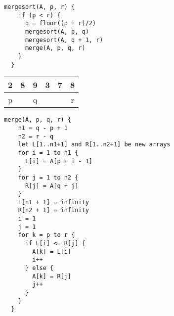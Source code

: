 \documentclass{article}
\begin{document}
\Large

\begin{Verbatim}[frame=single]
  mergesort(A, p, r) {
    if (p < r) {
      q = floor((p + r)/2)
      mergesort(A, p, q)
      mergesort(A, q + 1, r)
      merge(A, p, q, r)
    }
  }
\end{Verbatim}

\begin{tabular}{|c|c|c|c|c|c|}\hline
  2 & 8 & 9 & 3 & 7 & 8\\\hline
  p &&q&&&r\\\hline
\end{tabular}

\begin{Verbatim}[frame=single]
  merge(A, p, q, r) {
    n1 = q - p + 1
    n2 = r - q
    let L[1..n1+1] and R[1..n2+1] be new arrays
    for i = 1 to n1 {
      L[i] = A[p + i - 1]
    }
    for j = 1 to n2 {
      R[j] = A[q + j]
    }
    L[n1 + 1] = infinity
    R[n2 + 1] = infinity
    i = 1
    j = 1
    for k = p to r {
      if L[i] <= R[j] {
        A[k] = L[i]
        i++
      } else {
        A[k] = R[j]
        j++
      }
    }
  }
\end{Verbatim}
\end{document}

